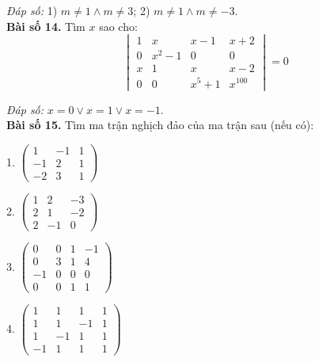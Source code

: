         \textit{Đáp số:} 1) \(m \neq 1 \land m \neq 3\); 2) \(m \neq 1 \land m \neq -3\).\\
\textbf{Bài số 14.} Tìm \(x\) sao cho:
        \[
        \begin{vmatrix}
        1 & x & x - 1 & x + 2 \\
        0 & x^2 - 1 & 0 & 0 \\
        x & 1 & x & x - 2 \\
        0 & 0 & x^5 + 1 & x^{100}
        \end{vmatrix} = 0
        \]
        
        \textit{Đáp số:} \(x = 0 \lor x = 1 \lor x = -1\).\\ 
\textbf{Bài số 15.} Tìm ma trận nghịch đảo của ma trận sau (nếu có):
        
        1.
        \(
        \begin{pmatrix}
        1 & -1 & 1 \\
        -1 & 2 & 1 \\
        -2 & 3 & 1
        \end{pmatrix}
        \)
        \vspace*{0.5cm}

        2.
        \(
        \begin{pmatrix}
        1 & 2 & -3 \\
        2 & 1 & -2 \\
        2 & -1 & 0
        \end{pmatrix}
        \)
        \vspace*{0.5cm}

        3.
        \(
        \begin{pmatrix}
        0 & 0 & 1 & -1 \\
        0 & 3 & 1 & 4 \\
        -1 & 0 & 0 & 0 \\
        0 & 0 & 1 & 1
        \end{pmatrix}
        \)
        \vspace*{0.5cm}

        4.
        \(
        \begin{pmatrix}
        1 & 1 & 1 & 1 \\
        1 & 1 & -1 & 1 \\
        1 & -1 & 1 & 1 \\
        -1 & 1 & 1 & 1
        \end{pmatrix}
        \)
        \vspace*{0.5cm}

